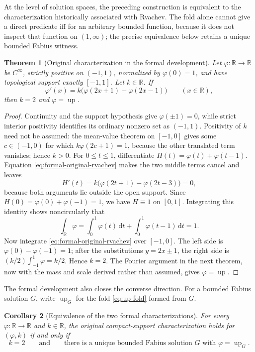 \documentclass[11pt,oneside]{article}
\newtheorem{theorem}{Theorem}[section]
\newtheorem{corollary}[theorem]{Corollary}
\theoremstyle{definition}
\theoremstyle{remark}
\newcommand{\R}{\mathbb R}
\newcommand{\Up}{\operatorname{up}}
\newcommand{\dd}{\,\mathrm d}
\begin{document}
At the level of solution spaces, the preceding construction is equivalent to the
characterization historically associated with Rvachev.  The fold alone cannot give a direct
predicate iff for an arbitrary bounded function, because it does not inspect that function
on $(1,\infty)$; the precise equivalence below retains a unique bounded Fabius witness.

\begin{theorem}[Original characterization in the formal development]
\label{thm:formal-original-characterization}
Let $\varphi:\R\to\R$ be $C^\infty$, strictly positive on $(-1,1)$, normalized by
$\varphi(0)=1$, and have topological support exactly $[-1,1]$.  Let $k\in\R$.  If
\begin{equation}
 \varphi'(x)=k\bigl(\varphi(2x+1)-\varphi(2x-1)\bigr)
 \qquad(x\in\R),                                           \label{eq:formal-original-rvachev}
\end{equation}
then $k=2$ and $\varphi=\Up$.
\end{theorem}

\begin{proof}
Continuity and the support hypothesis give $\varphi(\pm1)=0$, while strict interior
positivity identifies its ordinary nonzero set as $(-1,1)$.  Positivity of $k$ need not be
assumed: the mean-value theorem on $[-1,0]$ gives some $c\in(-1,0)$ for which
$k\varphi(2c+1)=1$, because the other translated term vanishes; hence $k>0$.
For $0\le t\le1$, differentiate
$H(t)=\varphi(t)+\varphi(t-1)$.  Equation \eqref{eq:formal-original-rvachev} makes the two
middle terms cancel and leaves
\[
 H'(t)=k\bigl(\varphi(2t+1)-\varphi(2t-3)\bigr)=0,
\]
because both arguments lie outside the open support.  Since
$H(0)=\varphi(0)+\varphi(-1)=1$, we have $H\equiv1$ on $[0,1]$.  Integrating this identity
shows noncircularly that
\[
 \int_{\R}\varphi=
 \int_0^1\varphi(t)\dd t+\int_0^1\varphi(t-1)\dd t=1.
\]
Now integrate \eqref{eq:formal-original-rvachev} over $[-1,0]$.  The left side is
$\varphi(0)-\varphi(-1)=1$; after the substitutions $y=2x\pm1$, the right side is
$(k/2)\int_{-1}^{1}\varphi=k/2$.  Hence $k=2$.  The Fourier argument in the next theorem,
now with the mass and scale derived rather than assumed, gives $\varphi=\Up$.
\end{proof}

The formal development also closes the converse direction.  For a bounded Fabius solution
$G$, write $\Up_G$ for the fold
\eqref{eq:up-fold} formed from $G$.

\begin{corollary}[Equivalence of the two formal characterizations]
For every $\varphi:\R\to\R$ and $k\in\R$, the original compact-support characterization
holds for $(\varphi,k)$ if and only if
\begin{equation}
 k=2\qquad\text{and}\qquad
 \text{there is a unique bounded Fabius solution $G$ with }\varphi=\Up_G.
                                                               \label{eq:formal-characterization-iff}
\end{equation}
\end{corollary}
\end{document}
